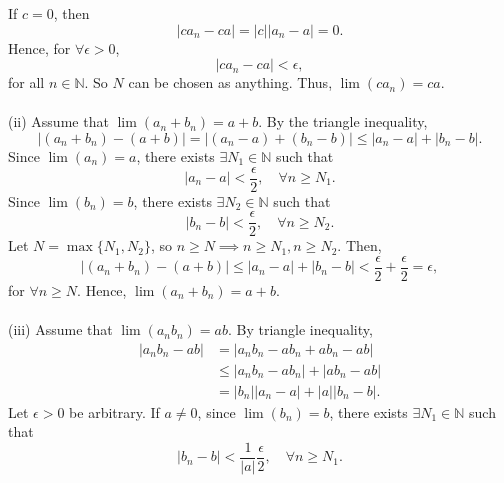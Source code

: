\documentclass{article}
\begin{document}
                If $c=0$, then 
                \begin{equation*}
                    |ca_n-ca|=|c||a_n-a|=0.
                \end{equation*}
                Hence, for $\forall \epsilon > 0$, 
                \begin{equation*}
                    |ca_n-ca|<\epsilon,
                \end{equation*}
                for all $n \in \mathbb{N}$. So $N$ can be chosen as anything. Thus, $\lim(ca_n)=ca$.
                \\ \\
                (ii) Assume that $\lim(a_n+b_n)=a+b$. By the triangle inequality,
                \begin{equation*}
                    |(a_n + b_n) - (a+b)| = |(a_n-a)+(b_n-b)| \leq |a_n-a| + |b_n-b|.
                \end{equation*}
                Since $\lim(a_n)=a$, there exists $\exists N_1 \in \mathbb{N}$ such that
                \begin{equation*}
                    |a_n-a| < \frac{\epsilon}{2}, \quad \forall n \geq N_1. 
                \end{equation*}
                Since $\lim(b_n)=b$, there exists $\exists N_2 \in \mathbb{N}$ such that
                \begin{equation*}
                    |b_n-b| < \frac{\epsilon}{2}, \quad \forall n \geq N_2. 
                \end{equation*}
                Let $N = \max \{N_1,N_2\}$, so $n \geq N \implies n \geq N_1, n \geq N_2$. Then,
                \begin{equation*}
                    |(a_n+b_n)-(a+b)| \leq |a_n-a|+|b_n-b|<\frac{\epsilon}{2}+\frac{\epsilon}{2}=\epsilon,
                \end{equation*}
                for $\forall n \geq N$. Hence, $\lim (a_n+b_n)=a+b$.
                \\ \\
                (iii) Assume that $\lim(a_nb_n)=ab$. By triangle inequality,
                \begin{align*}
                    |a_nb_n-ab| & = |a_nb_n - ab_n + ab_n - ab|\\ & \leq |a_nb_n - ab_n| + |ab_n - ab| \\
                    & = |b_n||a_n-a|+|a||b_n-b|.
                \end{align*}
                Let $\epsilon > 0$ be arbitrary. If $a \neq 0$, since $\lim (b_n)=b$, there exists $\exists N_1 \in \mathbb{N}$ such that
                \begin{equation*}
                    |b_n - b| < \frac{1}{|a|} \frac{\epsilon}{2}, \quad \forall n \geq N_1.
                \end{equation*}
                
\end{document}

